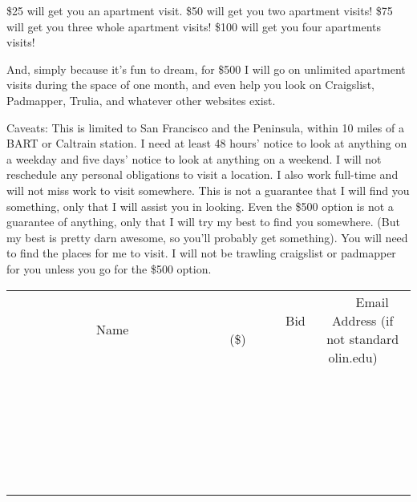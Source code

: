 \documentclass[11pt]{article}
\begin{document}
\$25 will get you an apartment visit.
\$50 will get you two apartment visits!
\$75 will get you three whole apartment visits!
\$100 will get you four apartments visits!

And, simply because it's fun to dream, for \$500 I will go on unlimited apartment visits during the space of one month, and even help you look on Craigslist, Padmapper, Trulia, and whatever other websites exist.

Caveats:
This is limited to San Francisco and the Peninsula, within 10 miles of a BART or Caltrain station.
I need at least 48 hours' notice to look at anything on a weekday and five days' notice to look at anything on a weekend. I will not reschedule any personal obligations to visit a location. I also work full-time and will not miss work to visit somewhere.
This is not a guarantee that I will find you something, only that I will assist you in looking. Even the \$500 option is not a guarantee of anything, only that I will try my best to find you somewhere. (But my best is pretty darn awesome, so you'll probably get something).
You will need to find the places for me to visit. I will not be trawling craigslist or padmapper for you unless you go for the \$500 option.
\\[6ex]
\begin{tabular}{c c c}
~~~~~~~~~~~~~Name~~~~~~~~~~~~~ & ~~~~~~~~~Bid (\$)~~~~~~~~~  & ~~~Email Address (if not standard olin.edu)~~~\\
 & & \\
\hline
 & & \\
\hline
 & & \\
\hline
 & & \\
\hline
 & & \\
\hline
 & & \\
\hline
 & & \\
\hline
 & & \\
\hline
 & & \\
\hline
 & & \\
\hline
 & & \\
\hline
 & & \\
\hline
 & & \\
\hline
 & & \\
\hline
 & & \\
\hline
 & & \\
\hline
 & & \\
\hline
 & & \\
\hline
 & & \\
\hline
 & & \\
\hline
 & & \\
\hline
 & & \\
\hline
 & & \\
\hline
 & & \\
\hline
 & & \\
\hline
 & & \\
\hline
\end{tabular}
\newpage
\end{document}
